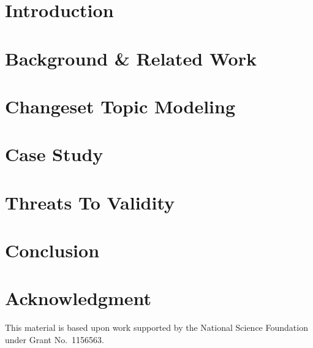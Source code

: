 \documentclass[conference]{IEEEtran}
\begin{document}
\section{Introduction}
\label{sec:intro}


\section{Background \& Related Work}
\label{sec:related}


\section{Changeset Topic Modeling}
\label{sec:changeset}


\section{Case Study}
\label{sec:study}


\section{Threats To Validity}
\label{sec:threats}


\section{Conclusion}
\label{sec:conclusion}



\begin{comment}
- Introduction
- Background
    - text retrieval
    - feature location techniques
    - related work
- Changeset model
- Case study
    - Definition and Context
        - RQs
    - Subject systems
        - Datasets
    - Setting (methodology)
        - Snapshot evaluation
        - Changeset evaluation
        - Temporal evaluation
    - Data Collection and Analysis
    - Results
- Threats to validity
- Conclusion
\end{comment}

\section*{Acknowledgment}
This material is based upon work supported
by the National Science Foundation under Grant No.\ 1156563. %



\end{document}
